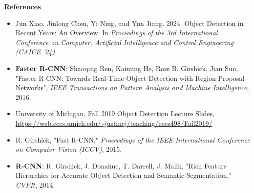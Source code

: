 \documentclass{beamer}
\begin{document}
\begin{frame}{\textbf{References}}
    \begin{itemize}

        \item Jun Xiao, Jinlong Chen, Yi Ning, and Yun Jiang. 2024. Object Detection in Recent Years: An Overview. In \textit{Proceedings of the 3rd International Conference on Computer, Artificial Intelligence and Control Engineering (CAICE '24)}.

        \item \textbf{Faster R-CNN}: Shaoqing Ren, Kaiming He, Ross B. Girshick, Jian Sun, "Faster R-CNN: Towards Real-Time Object Detection with Region Proposal Networks", \textit{IEEE Transactions on Pattern Analysis and Machine Intelligence}, 2016.
        \item University of Michigan, Fall 2019 Object Detection Lecture Slides, \url{https://web.eecs.umich.edu/~justincj/teaching/eecs498/Fall2019/}
        \item R. Girshick, "Fast R-CNN," \textit{Proceedings of the IEEE International Conference on Computer Vision (ICCV)}, 2015.
        \item \textbf{R-CNN}: R. Girshick, J. Donahue, T. Darrell, J. Malik, "Rich Feature Hierarchies for Accurate Object Detection and Semantic Segmentation," \textit{CVPR}, 2014.



    \end{itemize}
\end{frame}
\end{document}
